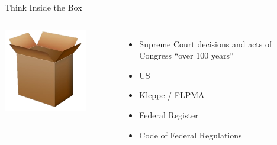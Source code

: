 \documentclass{beamer}
\begin{document}
\begin{frame}{Think Inside the Box}
    \begin{columns}[onlytextwidth]
            \centering
            \includegraphics[width=0.75\textwidth]{img/box.png} \\

            \begin{itemize}
                \item Supreme Court decisions and acts of Congress ``over 100 years''
                \pause
                \item US
                \pause
                \item Kleppe / FLPMA
                \pause
                \item Federal Register
                \pause
                \item Code of Federal Regulations
            \end{itemize}
    \end{columns}
\end{frame}
\end{document}
